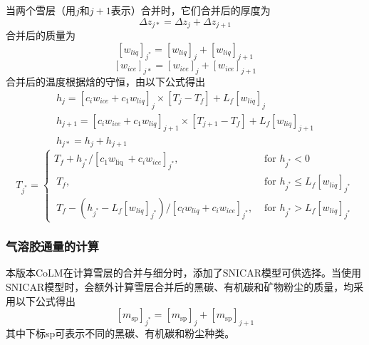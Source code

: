 当两个雪层（用$j$和$j+1$表示）合并时，它们合并后的厚度为
\begin{equation}
\Delta {z}_{{j} *}=\Delta {z}_{{j}}+\Delta {z}_{{j}+1}
\end{equation}
合并后的质量为
\begin{equation}
\left[{w}_{{liq}}\right]_{{j}^{*}}=\left[{w}_{{liq}}\right]_{{j}}+\left[{w}_{{liq}}\right]_{{j}+1}
\end{equation}
\begin{equation}
\left[{w}_{ {ice }}\right]_{j *}=\left[{w}_{ {ice }}\right]_{j}+\left[{w}_{ {ice }}\right]_{j+1}
\end{equation}
合并后的温度根据焓的守恒，由以下公式得出
\begin{equation}
\begin{array}{l}h_{j}=\left[c_{i} w_{ {ice }}+c_{1} w_{ {liq }}\right]_{j} \times\left[T_{j}-T_{f}\right]+L_{f}\left[w_{ {liq }}\right]_{j} \\ h_{j+1}=\left[c_{i} w_{ {ice }}+c_{1} w_{ {liq }}\right]_{j+1} \times\left[T_{j+1}-T_{f}\right]+L_{f}\left[w_{ {liq }}\right]_{j+1} \\ h_{j *}=h_{j}+h_{j+1}\end{array}
\end{equation}
\begin{equation}
{T}_{{j}^{*}}=\left\{\begin{array}{ll}{T}_{{f}}+{h}_{{j}^{*}} /\left[{c}_{1} {w}_{\text {liq }}+{c}_{{i}} {w}_{{ice}}\right]_{{j}^{*}}, & \text { for } {h}_{{j}^{*}}<0 \\ {~T}_{{f}}, & \text { for } {h}_{{j}^{*}} \leq {L}_{{f}}\left[{w}_{{liq}}\right]_{{j}^{*}} \\ {~T}_{{f}}-\left({h}_{{j}^{*}}-{L}_{{f}}\left[{w}_{{liq}}\right]_{{j}^{*}}\right) /\left[{c}_{{l}} {w}_{{liq}}+{c}_{{i}} {w}_{{ice}}\right]_{{j}^{*}}, & \text { for } {h}_{{j}^{*}}>{L}_{{f}}\left[{w}_{{liq}}\right]_{{j}^{*}}\end{array}\right.
\end{equation}


\subsubsection{气溶胶通量的计算}

本版本CoLM在计算雪层的合并与细分时，添加了SNICAR模型可供选择。当使用SNICAR模型时，会额外计算雪层合并后的黑碳、有机碳和矿物粉尘的质量，均采用以下公式得出
\begin{equation}
\left[m_{\mathrm{sp}}\right]_{j^{*}}=\left[m_{\mathrm{sp}}\right]_{j}+\left[m_{\mathrm{sp}}\right]_{j+1}
\end{equation}
其中下标sp可表示不同的黑碳、有机碳和粉尘种类。
